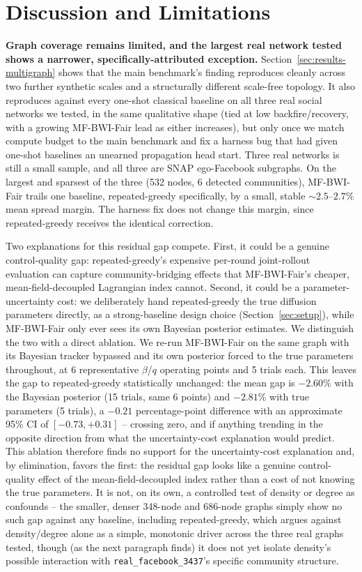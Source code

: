 \documentclass[journal]{IEEEtran}
\begin{document}
\section{Discussion and Limitations}
\label{sec:limitations}

\textbf{Graph coverage remains limited, and the largest real network
tested shows a narrower, specifically-attributed exception.}
Section~\ref{sec:results-multigraph} shows that the main benchmark's
finding reproduces cleanly across two further synthetic scales and a
structurally different scale-free topology. It also reproduces against
every one-shot classical baseline on all three real social networks we
tested, in the same qualitative shape (tied at low backfire/recovery,
with a growing MF-BWI-Fair lead as either increases), but only once we
match compute budget to the main benchmark and fix a harness bug that
had given one-shot baselines an unearned propagation head start. Three
real networks is still a small sample, and all three are SNAP
ego-Facebook subgraphs. On the largest and sparsest of the three (532
nodes, 6 detected communities), MF-BWI-Fair trails one baseline,
repeated-greedy specifically, by a small, stable $\sim\!2.5$--$2.7\%$
mean spread margin. The harness fix does not change this margin, since
repeated-greedy receives the identical correction.

Two explanations for this residual gap compete. First, it could be a
genuine control-quality gap: repeated-greedy's expensive per-round
joint-rollout evaluation can capture community-bridging effects that
MF-BWI-Fair's cheaper, mean-field-decoupled Lagrangian index cannot.
Second, it could be a parameter-uncertainty cost: we deliberately hand
repeated-greedy the true diffusion parameters directly, as a
strong-baseline design choice (Section~\ref{sec:setup}), while
MF-BWI-Fair only ever sees its own Bayesian posterior estimates. We
distinguish the two with a direct ablation. We re-run MF-BWI-Fair on the
same graph with its Bayesian tracker bypassed and its own posterior
forced to the true parameters throughout, at 6 representative $\beta$/$q$
operating points and 5 trials each. This leaves the gap to
repeated-greedy statistically unchanged: the mean gap is $-2.60\%$ with
the Bayesian posterior (15 trials, same 6 points) and $-2.81\%$ with true
parameters (5 trials), a $-0.21$ percentage-point difference with an
approximate 95\% CI of $[-0.73,+0.31]$ -- crossing zero, and if anything
trending in the opposite direction from what the uncertainty-cost
explanation would predict. This ablation therefore finds no support for
the uncertainty-cost explanation and, by elimination, favors the first:
the residual gap looks like a genuine control-quality effect of the
mean-field-decoupled index rather than a cost of not knowing the true
parameters. It is not, on its own, a controlled test of density or
degree as confounds -- the smaller, denser 348-node and 686-node graphs
simply show no such gap against any baseline, including repeated-greedy,
which argues against density/degree alone as a simple, monotonic driver
across the three real graphs tested, though (as the next paragraph
finds) it does not yet isolate density's possible interaction with
\texttt{real\_facebook\_3437}'s specific community structure.
\end{document}
